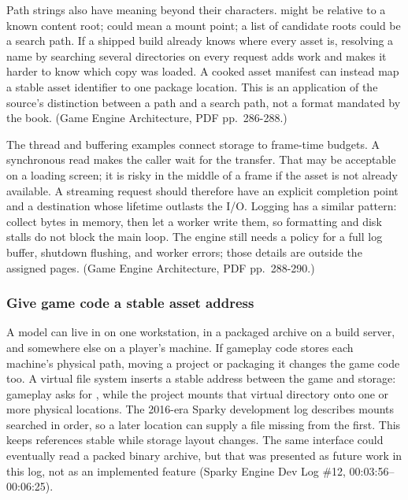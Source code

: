 Path strings also have meaning beyond their characters.  might be relative to a known content root; \BookInlineCode{{/}}{/} could mean a mount point; a list of candidate roots could be a search path. If a shipped build already knows where every asset is, resolving a name by searching several directories on every request adds work and makes it harder to know which copy was loaded. A cooked asset manifest can instead map a stable asset identifier to one package location. This is an application of the source's distinction between a path and a search path, not a format mandated by the book. (Game Engine Architecture, PDF pp.~286-288.)

The thread and buffering examples connect storage to frame-time budgets. A synchronous read makes the caller wait for the transfer. That may be acceptable on a loading screen; it is risky in the middle of a frame if the asset is not already available. A streaming request should therefore have an explicit completion point and a destination whose lifetime outlasts the I/O. Logging has a similar pattern: collect bytes in memory, then let a worker write them, so formatting and disk stalls do not block the main loop. The engine still needs a policy for a full log buffer, shutdown flushing, and worker errors; those details are outside the assigned pages. (Game Engine Architecture, PDF pp.~288-290.)

\subsubsection{Give game code a stable asset address}\label{06-engine-ii-ch027-give-game-code-a-stable-asset-address}

\hypertarget{06-engine-ii-ch027-give-game-code-a-stable-asset-address}{}

A model can live in  on one workstation, in a packaged archive on a build server, and somewhere else on a player's machine. If gameplay code stores each machine's physical path, moving a project or packaging it changes the game code too. A virtual file system inserts a stable address between the game and storage: gameplay asks for , while the project mounts that virtual directory onto one or more physical locations. The 2016-era Sparky development log describes mounts searched in order, so a later location can supply a file missing from the first. This keeps references stable while storage layout changes. The same interface could eventually read a packed binary archive, but that was presented as future work in this log, not as an implemented feature (Sparky Engine Dev Log \#12, 00:03:56--00:06:25).

